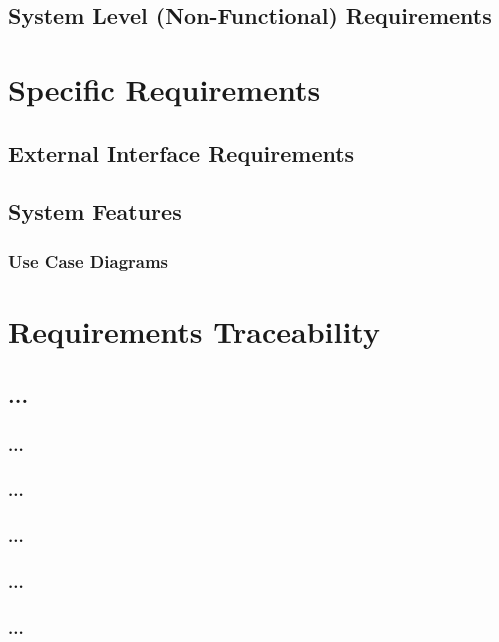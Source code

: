 \documentclass[12pt, oneside, letterpaper]{report}
\begin{document}
	\section{System Level (Non-Functional) Requirements}
		
\chapter{Specific Requirements}
	\section{External Interface Requirements}
		
	\section{System Features}
		\subsection{Use Case Diagrams}
		
		
		
		




\chapter{Requirements Traceability}
		\section{...}
			\subsection{...}
			\subsection{...}
			\subsection{...}
			\subsection{...}
			\subsection{...}
\end{document}
